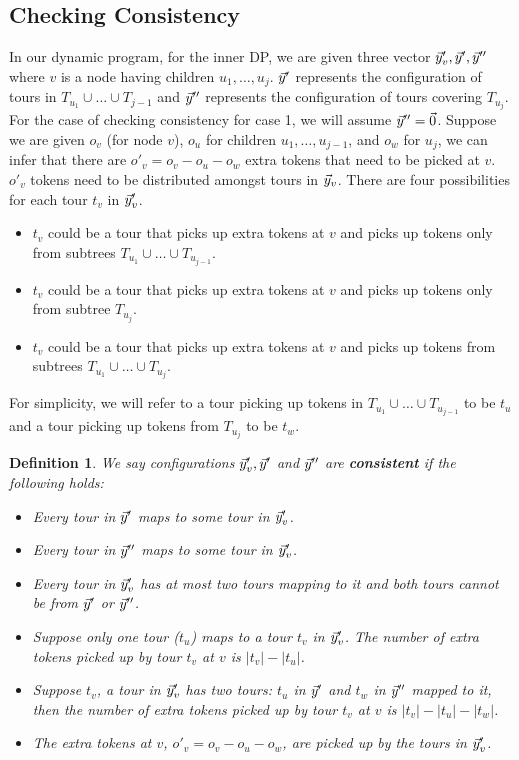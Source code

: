 \documentclass[twoside,leqno]{article}
\newtheorem{definition}{Definition}
\begin{document}
\subsection{Checking Consistency}
In our dynamic program, for the inner DP, we are given three vector $\vec{y}_v', \vec{y}', \vec{y}''$ where $v$ is a node having children $u_1, \ldots, u_{j}$. $\vec{y}'$ represents the configuration of tours in $T_{u_1} \cup \ldots \cup T_{j-1}$ and $\vec{y}''$ represents the configuration of tours covering $T_{u_{j}}$. For the case of checking consistency for case 1, we will assume $\vec{y}'' = \vec{0}$. Suppose we are given $o_v$ (for node $v$), $o_u$ for children $u_1,\ldots,u_{j-1}$, and
$o_w$ for $u_j$, we can infer that there are $o'_v = o_v - o_u - o_w$ extra tokens that need to be picked at $v$. $o'_v$ tokens need to be distributed amongst tours in $\vec{y}_v$.
There are four possibilities for each tour $t_v$ in $\vec{y}_v'$.
\begin{itemize}
    \item $t_v$ could be a tour that picks up extra tokens at $v$ and picks up tokens only from subtrees $T_{u_1} \cup \ldots \cup T_{u_{j-1}}$.
    \item $t_v$ could be a tour that picks up extra tokens at $v$ and picks up tokens only from subtree $T_{u_{j}}$.
    \item $t_v$ could be a tour that picks up extra tokens at $v$ and picks up tokens from subtrees $T_{u_1} \cup \ldots \cup T_{u_{j}}$.
\end{itemize}
For simplicity, we will refer to a tour picking up tokens in $T_{u_1} \cup \ldots \cup T_{u_{j-1}}$ to be $t_u$ and a tour picking up tokens from $T_{u_{j}}$ to be $t_w$.
\begin{definition}
We say configurations $\vec{y}_v', \vec{y}'$ and $\vec{y}''$ are \textbf{consistent} if the following holds:
\begin{itemize}
    \item Every tour in $\vec{y}'$ maps to some tour in $\vec{y}_v'$.
    \item Every tour in $\vec{y}''$ maps to some tour in $\vec{y}_v'$.
    \item Every tour in $\vec{y}_v'$ has at most two tours mapping to it and both tours cannot be from $\vec{y}'$ or $\vec{y}''$.
    \item Suppose only one tour ($t_u$) maps to a tour $t_v$ in $\vec{y}_v'$. The number of extra tokens picked up by tour $t_v$ at $v$ is $|t_v| - |t_u|$.
    \item Suppose $t_v$, a tour in $\vec{y}_v'$ has two tours: $t_u$ in $\vec{y}'$ and $t_w$ in $\vec{y}''$ mapped to it, then the number of extra tokens picked up by tour $t_v$ at $v$ is $|t_v| - |t_u| - |t_w|$.
    \item The extra tokens at $v$, $o'_v = o_v - o_u - o_w$, are picked up by the tours in $\vec{y}_v'$.
\end{itemize}
\end{definition}
\end{document}
